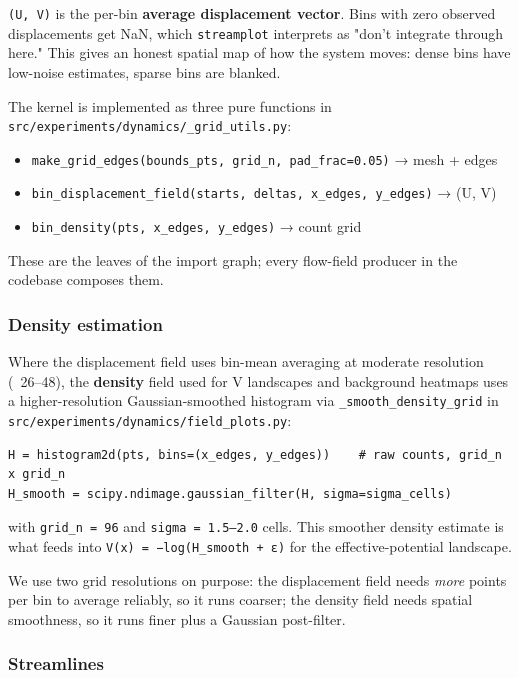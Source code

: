 \documentclass{article}
\theoremstyle{plain}
\theoremstyle{definition}
\begin{document}
\texttt{(U, V)} is the per-bin \textbf{average displacement vector}. Bins with
zero observed displacements get NaN, which \texttt{streamplot} interprets as
"don't integrate through here." This gives an honest spatial map of
how the system moves: dense bins have low-noise estimates, sparse bins
are blanked.

The kernel is implemented as three pure functions in
\texttt{src/experiments/dynamics/\_grid\_utils.py}:

\begin{itemize}
  \item \texttt{make\_grid\_edges(bounds\_pts, grid\_n, pad\_frac=0.05)} → mesh + edges
  \item \texttt{bin\_displacement\_field(starts, deltas, x\_edges, y\_edges)} → (U, V)
  \item \texttt{bin\_density(pts, x\_edges, y\_edges)} → count grid
\end{itemize}

These are the leaves of the import graph; every flow-field producer
in the codebase composes them.

\subsubsection{Density estimation}

Where the displacement field uses bin-mean averaging at moderate
resolution (~26–48), the \textbf{density} field used for V landscapes and
background heatmaps uses a higher-resolution Gaussian-smoothed
histogram via \texttt{\_smooth\_density\_grid} in
\texttt{src/experiments/dynamics/field\_plots.py}:

\begin{verbatim}
H = histogram2d(pts, bins=(x_edges, y_edges))    # raw counts, grid_n x grid_n
H_smooth = scipy.ndimage.gaussian_filter(H, sigma=sigma_cells)
\end{verbatim}

with \texttt{grid\_n = 96} and \texttt{sigma = 1.5–2.0} cells. This smoother density
estimate is what feeds into \texttt{V(x) = −log(H\_smooth + ε)} for the
effective-potential landscape.

We use two grid resolutions on purpose: the displacement field needs
\textit{more} points per bin to average reliably, so it runs coarser; the
density field needs spatial smoothness, so it runs finer plus a
Gaussian post-filter.

\subsubsection{Streamlines}
\end{document}
